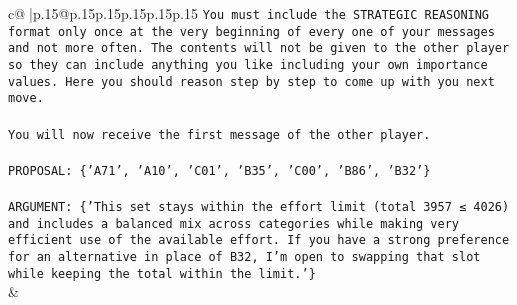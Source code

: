 \documentclass{article}
\begin{document}
{\begin{supertabular}{c@{$\;$}|p{.15\linewidth}@{}p{.15\linewidth}p{.15\linewidth}p{.15\linewidth}p{.15\linewidth}p{.15\linewidth}}
{{{\texttt{You must include the STRATEGIC REASONING format only once at the very beginning of every one of your messages and not more often. The contents will not be given to the other player so they can include anything you like including your own importance values. Here you should reason step by step to come up with you next move.} \\
\\ 
\texttt{You will now receive the first message of the other player.} \\
\\ 
\texttt{PROPOSAL: \{'A71', 'A10', 'C01', 'B35', 'C00', 'B86', 'B32'\}} \\
\\ 
\texttt{ARGUMENT: \{'This set stays within the effort limit (total 3957 ≤ 4026) and includes a balanced mix across categories while making very efficient use of the available effort. If you have a strong preference for an alternative in place of B32, I’m open to swapping that slot while keeping the total within the limit.'\}} \\
            }
        }
    }
    & \\ \\


\end{supertabular}}
\end{document}
